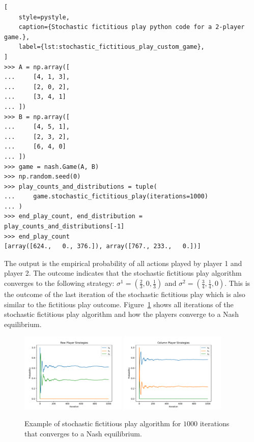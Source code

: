 \begin{lstlisting}[
    style=pystyle,
    caption={Stochastic fictitious play python code for a 2-player game.},
    label={lst:stochastic_fictitious_play_custom_game},
]
>>> A = np.array([
...     [4, 1, 3],
...     [2, 0, 2],
...     [3, 4, 1]
... ])
>>> B = np.array([
...     [4, 5, 1],
...     [2, 3, 2],
...     [6, 4, 0]
... ])
>>> game = nash.Game(A, B)
>>> np.random.seed(0)
>>> play_counts_and_distributions = tuple(
...     game.stochastic_fictitious_play(iterations=1000)
... )
>>> end_play_count, end_distribution = play_counts_and_distributions[-1]
>>> end_play_count
[array([624.,   0., 376.]), array([767., 233.,   0.])]

\end{lstlisting}

The output is the empirical probability of all actions played by player 1 and
player 2.
The outcome indicates that the stochastic fictitious play algorithm converges
to the following strategy: \(\sigma^1 = (\frac{2}{3}, 0, \frac{1}{3})\) and
\(\sigma^2 = (\frac{3}{4}, \frac{1}{4}, 0)\).
This is the outcome of the last iteration of the stochastic fictitious play
which is also similar to the fictitious play outcome.
Figure~\ref{fig:stochastic_fictitious_play} shows all iterations of the
stochastic fictitious play algorithm and how the players converge to a Nash
equilibrium.

\begin{figure}[H]
    \centering
    \includegraphics[width=0.45\textwidth]{chapters/04_game_theoretic_model/Bin/learning_algorithms_example/stochastic_row.pdf}
    \includegraphics[width=0.45\textwidth]{chapters/04_game_theoretic_model/Bin/learning_algorithms_example/stochastic_col.pdf}
    \caption{Example of stochastic fictitious play algorithm for \(1000\)
    iterations that converges to a Nash equilibrium.}
    \label{fig:stochastic_fictitious_play}
\end{figure}


